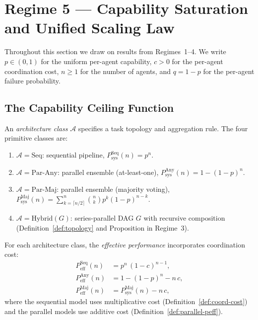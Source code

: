\section{Regime 5 --- Capability Saturation and Unified Scaling Law}
\label{sec:regime5}


Throughout this section we draw on results from Regimes~1--4. We write
$p \in (0,1)$ for the uniform per-agent capability, $c > 0$ for the per-agent
coordination cost, $n \geq 1$ for the number of agents, and $q = 1 - p$ for the
per-agent failure probability.

\subsection{The Capability Ceiling Function}
\label{subsec:ceiling}

\begin{definition}
\label{def:regime5-arch}
An \emph{architecture class} $\mathcal{A}$ specifies a task topology and aggregation
rule. The four primitive classes are:
\begin{enumerate}
  \item $\mathcal{A} = \mathrm{Seq}$: sequential pipeline, $P_{\mathrm{sys}}^{\mathrm{Seq}}(n) = p^n$.
  \item $\mathcal{A} = \mathrm{Par\text{-}Any}$: parallel ensemble (at-least-one),
    $P_{\mathrm{sys}}^{\mathrm{Any}}(n) = 1 - (1-p)^n$.
  \item $\mathcal{A} = \mathrm{Par\text{-}Maj}$: parallel ensemble (majority voting),
    $P_{\mathrm{sys}}^{\mathrm{Maj}}(n) = \sum_{k=\lceil n/2\rceil}^{n}\binom{n}{k}p^k(1-p)^{n-k}$.
  \item $\mathcal{A} = \mathrm{Hybrid}(G)$: series-parallel DAG $G$ with recursive
    composition (Definition~\ref{def:topology} and Proposition in Regime~3).
\end{enumerate}
\end{definition}

\begin{definition}
\label{def:regime5-peff}
For each architecture class, the \emph{effective performance} incorporates coordination
cost:
\begin{align}
  P_{\mathrm{eff}}^{\mathrm{Seq}}(n) &= p^n\,(1-c)^{n-1},
    \label{eq:peff-seq} \\
  P_{\mathrm{eff}}^{\mathrm{Any}}(n) &= 1 - (1-p)^n - n\,c,
    \label{eq:peff-any} \\
  P_{\mathrm{eff}}^{\mathrm{Maj}}(n) &= P_{\mathrm{sys}}^{\mathrm{Maj}}(n) - n\,c,
    \label{eq:peff-maj}
\end{align}
where the sequential model uses multiplicative cost (Definition~\ref{def:coord-cost})
and the parallel models use additive cost (Definition~\ref{def:parallel-peff}).
\end{definition}

